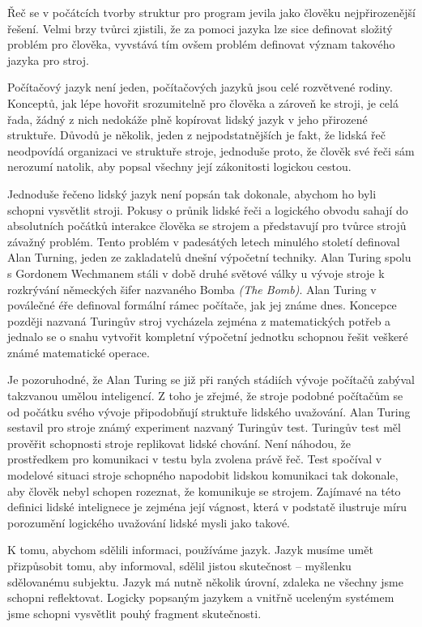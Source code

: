 \documentclass[10pt]{book}
\begin{document}
Řeč se v počátcích tvorby struktur pro program jevila jako člověku nejpřirozenější řešení. Velmi brzy tvůrci zjistili, že za pomoci jazyka lze sice definovat složitý problém pro člověka, vyvstává tím ovšem problém definovat význam takového jazyka pro stroj.

Počítačový jazyk není jeden, počítačových jazyků jsou celé rozvětvené rodiny. Konceptů, jak lépe hovořit srozumitelně pro člověka a zároveň ke stroji, je celá řada, žádný z nich nedokáže plně kopírovat lidský jazyk v jeho přirozené struktuře. Důvodů je několik, jeden z nejpodstatnějších je fakt, že lidská řeč neodpovídá organizaci ve struktuře stroje, jednoduše proto, že člověk své řeči sám nerozumí natolik, aby popsal všechny její zákonitosti logickou cestou.

Jednoduše řečeno lidský jazyk není popsán tak dokonale, abychom ho byli schopni vysvětlit stroji. Pokusy o průnik lidské řeči a logického obvodu sahají do absolutních počátků interakce člověka se strojem a představují pro tvůrce strojů závažný problém. Tento problém v padesátých letech minulého století definoval Alan Turning, jeden ze zakladatelů dnešní výpočetní techniky. Alan Turing spolu s Gordonem Wechmanem stáli v době druhé světové války u vývoje stroje k rozkrývání německých šifer nazvaného Bomba {\em (The Bomb)}. Alan Turing v poválečné éře definoval formální rámec počítače, jak jej známe dnes. Koncepce později nazvaná Turingův stroj vycházela zejména z matematických potřeb a jednalo se o snahu vytvořit kompletní výpočetní jednotku schopnou řešit veškeré známé matematické operace.  


Je pozoruhodné, že Alan Turing se již při raných stádiích vývoje počítačů zabýval takzvanou umělou inteligencí. Z toho je zřejmé, že stroje podobné počítačům se od počátku svého vývoje připodobňují struktuře lidského uvažování. Alan Turing sestavil pro stroje známý experiment nazvaný Turingův test. Turingův test měl prověřit schopnosti stroje replikovat lidské chování. Není náhodou, že prostředkem pro komunikaci v testu byla zvolena právě řeč. Test spočíval v modelové situaci stroje schopného napodobit lidskou komunikaci tak dokonale, aby člověk nebyl schopen rozeznat, že komunikuje se strojem. Zajímavé na této definici lidské intelignece je zejména její vágnost, která v podstatě ilustruje míru porozumění logického uvažování lidské mysli jako takové.

K tomu, abychom sdělili informaci, používáme jazyk. Jazyk musíme umět přizpůsobit tomu, aby informoval, sdělil jistou skutečnost -- myšlenku sdělovanému subjektu. Jazyk má nutně několik úrovní, zdaleka ne všechny jsme schopni reflektovat. Logicky popsaným jazykem a vnitřně uceleným systémem jsme schopni vysvětlit pouhý fragment skutečnosti.
\end{document}
